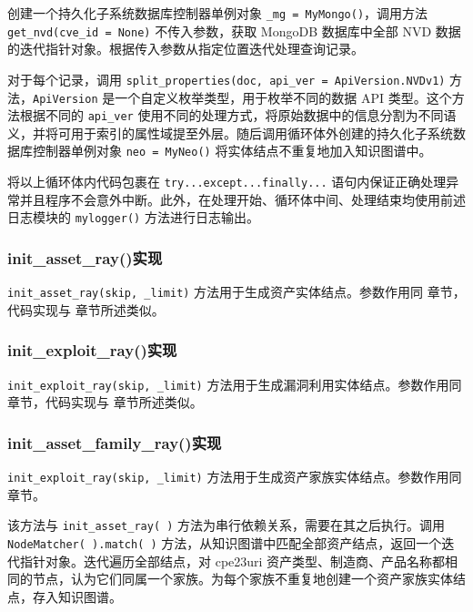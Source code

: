 \documentclass[a4paper,AutoFakeBold,oneside,12pt]{book}
\begin{document}
创建一个持久化子系统数据库控制器单例对象 \lstinline|_mg = MyMongo()|，调用方法 \lstinline|get_nvd(cve_id = None)| 不传入参数，获取 MongoDB 数据库中全部 NVD 数据的迭代指针对象。根据传入参数从指定位置迭代处理查询记录。

对于每个记录，调用 \lstinline|split_properties(doc, api_ver = ApiVersion.NVDv1)| 方法，\lstinline|ApiVersion| 是一个自定义枚举类型，用于枚举不同的数据 API 类型。这个方法根据不同的 \lstinline|api_ver| 使用不同的处理方式，将原始数据中的信息分割为不同语义，并将可用于索引的属性域提至外层。随后调用循环体外创建的持久化子系统数据库控制器单例对象 \lstinline|neo = MyNeo()| 将实体结点不重复地加入知识图谱中。

将以上循环体内代码包裹在 \lstinline|try...except...finally...| 语句内保证正确处理异常并且程序不会意外中断。此外，在处理开始、循环体中间、处理结束均使用前述日志模块的 \lstinline|mylogger()| 方法进行日志输出。

\subsubsection{init{\_}asset{\_}ray()实现}

\lstinline|init_asset_ray(skip, _limit)| 方法用于生成资产实体结点。参数作用同  章节，代码实现与  章节所述类似。

\subsubsection{init{\_}exploit{\_}ray()实现}

\lstinline|init_exploit_ray(skip, _limit)| 方法用于生成漏洞利用实体结点。参数作用同  章节，代码实现与  章节所述类似。

\subsubsection{init{\_}asset{\_}family{\_}ray()实现}

\lstinline|init_exploit_ray(skip, _limit)| 方法用于生成资产家族实体结点。参数作用同  章节。

该方法与 \lstinline|init_asset_ray( )| 方法为串行依赖关系，需要在其之后执行。调用 \lstinline|NodeMatcher( ).match( )| 方法，从知识图谱中匹配全部资产结点，返回一个迭代指针对象。迭代遍历全部结点，对 cpe23uri 资产类型、制造商、产品名称都相同的节点，认为它们同属一个家族。为每个家族不重复地创建一个资产家族实体结点，存入知识图谱。
\end{document}
